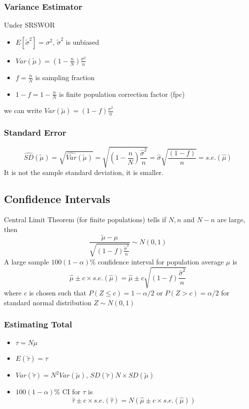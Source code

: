\documentclass[11pt]{article}
\begin{document}
\subsubsection*{Variance Estimator}
Under SRSWOR
\begin{itemize}
    \item $E[\tilde{\sigma}^2]=\sigma^2$, $\tilde{\sigma}^2$ is unbiased 
    \item $Var(\tilde{\mu})=(1-\frac{n}{N})\frac{\sigma^2}{n}$
    \item $f=\frac{n}{N}$ is sampling fraction
    \item $1-f=1-\frac{n}{N}$ is finite population correction factor (fpc)
\end{itemize}
we can write $Var(\tilde{\mu})=(1-f)\frac{\sigma^2}{n}$
\subsubsection*{Standard Error}
\[\hat{SD}(\tilde{\mu})=\sqrt{\hat{Var}(\tilde{\mu})}=\sqrt{(1-\frac{n}{N})\frac{\hat{\sigma}^2}{n}}=\hat{\sigma}\sqrt{\frac{(1-f)}{n}} = s.e.(\hat{\mu})\]
It is not the sample standard deviation, it is smaller. 
\subsection{Confidence Intervals}
Central Limit Theorem (for finite populations) tells if $N, n$ and $N-n$ are large, then  
\[\frac{\tilde{\mu}-\mu}{\sqrt{(1-f)\frac{\tilde{\sigma}^2}{n}}}\sim N(0,1)\]
A large sample $100(1-\alpha)\%$ confidence interval for population average $\mu$ is 
\[\hat{\mu}\pm c\times s.e.(\hat{\mu})=\hat{\mu}\pm c\sqrt{(1-f)\frac{\hat{\sigma}^2}{n}}\]
where $c$ is chosen such that $P(Z\leq c)=1-\alpha/2$ or $P(Z>c)=\alpha/2$ for standard normal distribution $Z\sim N(0,1)$
\subsubsection*{Estimating Total}
\begin{itemize}
    \item $\tau=N\mu$
    \item $E(\tilde{\tau})=\tau$
    \item $Var(\tilde{\tau})=N^2Var(\tilde{\mu})$, $SD(\tilde{\tau})N\times SD(\tilde{\mu})$
    \item $100(1-\alpha)\%$ CI for $\tau$ is \[\hat{\tau}\pm c\times s.e.(\hat{\tau}) = N(\hat{\mu}\pm c\times s.e.(\hat{\mu}))\]
\end{itemize}
\end{document}
